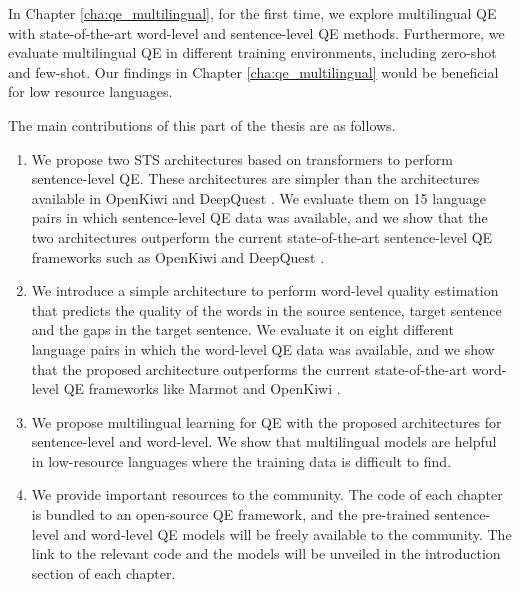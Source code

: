 In Chapter \ref{cha:qe_multilingual}, for the first time, we explore multilingual QE with state-of-the-art word-level and sentence-level QE methods. Furthermore, we evaluate multilingual QE in different training environments, including zero-shot and few-shot. Our findings in Chapter \ref{cha:qe_multilingual} would be beneficial for low resource languages. 


The main contributions of this part of the thesis are as follows.

\begin{enumerate}

	\item We propose two STS architectures based on transformers to perform sentence-level QE. These architectures are simpler than the  architectures available in OpenKiwi \autocite{kepler-etal-2019-openkiwi} and DeepQuest \autocite{ive-etal-2018-deepquest}. We evaluate them on 15 language pairs in which sentence-level QE data was available, and we show that the two architectures outperform the current state-of-the-art sentence-level QE frameworks such as OpenKiwi \autocite{kepler-etal-2019-openkiwi} and DeepQuest \autocite{ive-etal-2018-deepquest}.
	
	
	\item We introduce a simple architecture to perform word-level quality estimation that predicts the quality of the words in the source sentence, target sentence and the gaps in the target sentence. We evaluate it on eight different language pairs in which the word-level QE data was available, and we show that the proposed architecture outperforms the current state-of-the-art word-level QE frameworks like Marmot \autocite{logacheva-etal-2016-marmot} and OpenKiwi \autocite{kepler-etal-2019-openkiwi}.

	\item We propose multilingual learning for QE with the proposed architectures for sentence-level and word-level. We show that multilingual models are helpful in low-resource languages where the training data is difficult to find. 
	
	\item We provide important resources to the community. The code of each chapter is bundled to an open-source QE framework, and the pre-trained sentence-level and word-level QE models will be freely available to the community. The link to the relevant code and the models will be unveiled in the introduction section of each chapter. 
\end{enumerate}

